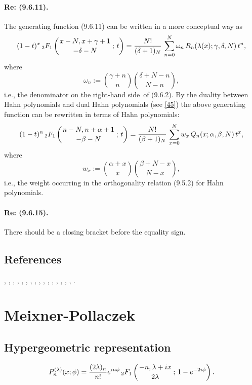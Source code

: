 \documentclass[envcountchap,graybox]{svmono}
\newcommand{\hyp}[5]{\mbox{}_{#1}{F}_{#2}
\left(\genfrac{}{}{0pt}{}{#3}{#4}\,;\,#5\right)}
\newcommand\al\alpha
\newcommand\be\beta
\newcommand\ga\gamma
\newcommand\de\delta
\newcommand\la\lambda
\newcommand\om\omega
\newcommand\RHS{right-hand side}
\begin{document}
\paragraph{Re: (9.6.11).}
The generating function (9.6.11) can be written in a more conceptual way as
\begin{equation}
(1-t)^x\,\hyp21{x-N,x+\ga+1}{-\de-N}t=\frac{N!}{(\de+1)_N}\,
\sum_{n=0}^N \om_n\,R_n(\la(x);\ga,\de,N)\,t^n,
\label{2}
\end{equation}
where
\begin{equation}
\om_n:=\binom{\ga+n}n \binom{\de+N-n}{N-n},
\label{3}
\end{equation}
i.e., the denominator on the \RHS\ of (9.6.2).
By the duality between Hahn polynomials and dual Hahn polynomials (see \eqref{45}) the above generating function can be rewritten in
terms of Hahn polynomials:
\begin{equation}
(1-t)^n\,\hyp21{n-N,n+\al+1}{-\be-N}t=\frac{N!}{(\be+1)_N}\,
\sum_{x=0}^N w_x\,Q_n(x;\al,\be,N)\,t^x,
\label{4}
\end{equation}
where
\begin{equation}
w_x:=\binom{\al+x}x \binom{\be+N-x}{N-x},
\label{5}
\end{equation}
i.e., the weight occurring in the orthogonality relation (9.5.2)
for Hahn polynomials.
\paragraph{Re: (9.6.15).}
There should be a closing bracket before the equality sign.
%

\subsection*{References}
\cite{Askey2005}, \cite{AskeyWilson85}, \cite{AtakRahmanSuslov}, \cite{AtakSuslov88},
\cite{Ismail2005II}, \cite{Karlin61}, \cite{Koorn81}, \cite{Koorn88}, \cite{Lesky93},
\cite{Lesky94I}, \cite{Lesky95I}, \cite{Lesky95II}, \cite{Nikiforov+}, \cite{NikiforovUvarov},
\cite{Rahman81II}, \cite{Stanton84}, \cite{Wilson80}.


\section{Meixner-Pollaczek}

\par\setcounter{equation}{0}

\subsection*{Hypergeometric representation}
\begin{equation}
\label{DefMP}
P_n^{(\lambda)}(x;\phi)=\frac{(2\lambda)_n}{n!}\expe^{in\phi}\,
\hyp{2}{1}{-n,\lambda+ix}{2\lambda}{1-\expe^{-2i\phi}}.
\end{equation}
\end{document}
